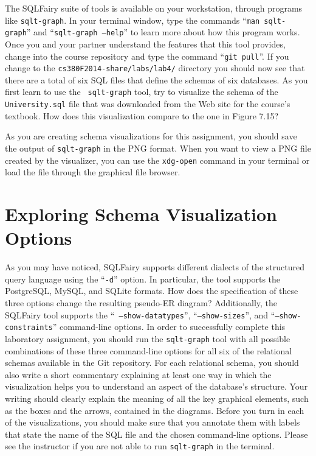 The SQLFairy suite of tools is available on your workstation, through programs like {\tt sqlt-graph}.  In your terminal
window, type the commands ``{\tt man sqlt-graph}'' and ``{\tt sqlt-graph --help}'' to learn more about how this program
works. Once you and your partner understand the features that this tool provides, change into the course repository and
type the command ``{\tt git pull}''. If you change to the {\tt cs380F2014-share/labs/lab4/} directory you should now see
that there are a total of six SQL files that define the schemas of six databases. As you first learn to use the {\tt
  sqlt-graph} tool, try to visualize the schema of the {\tt University.sql} file that was downloaded from the Web site
for the course's textbook. How does this visualization compare to the one in Figure 7.15? 

As you are creating schema visualizations for this assignment, you should save the output of {\tt sqlt-graph} in the PNG
format.  When you want to view a PNG file created by the visualizer, you can use the {\tt xdg-open} command in your
terminal or load the file through the graphical file browser.

\vspace*{-.05in}
\section*{Exploring Schema Visualization Options}

As you may have noticed, SQLFairy supports different dialects of the structured query language using the ``{\tt -d}''
option.  In particular, the tool supports the PostgreSQL, MySQL, and SQLite formats.  How does the specification of
these three options change the resulting pseudo-ER diagram? Additionally, the SQLFairy tool supports the ``{\tt
  --show-datatypes}'', ``{\tt --show-sizes}'', and ``{\tt --show-constraints}'' command-line options.  In order to
successfully complete this laboratory assignment, you should run the {\tt sqlt-graph} tool with all possible
combinations of these three command-line options for all six of the relational schemas available in the Git repository.
For each relational schema, you should also write a short commentary explaining at least one way in which the
visualization helps you to understand an aspect of the database's structure. Your writing should clearly explain the
meaning of all the key graphical elements, such as the boxes and the arrows, contained in the diagrams. Before you turn
in each of the visualizations, you should make sure that you annotate them with labels that state the name of the SQL
file and the chosen command-line options. Please see the instructor if you are not able to run {\tt sqlt-graph} in the
terminal.


